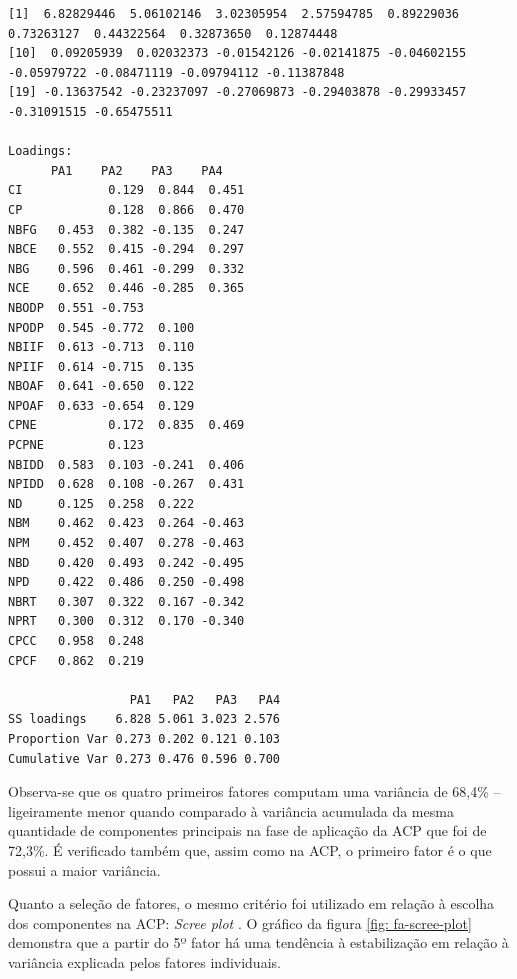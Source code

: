 \begin{lstlisting}[label={lst:loadings_fa_antes_rotacao}, captionpos=b, 
caption={Carregamentos da AF: o primeiro fator demonstra similaridade com o primeiro componente da ACP o que confirma a solidez e consistência das constatações até aqui verificadas.}]
 [1]  6.82829446  5.06102146  3.02305954  2.57594785  0.89229036  0.73263127  0.44322564  0.32873650  0.12874448
[10]  0.09205939  0.02032373 -0.01542126 -0.02141875 -0.04602155 -0.05979722 -0.08471119 -0.09794112 -0.11387848
[19] -0.13637542 -0.23237097 -0.27069873 -0.29403878 -0.29933457 -0.31091515 -0.65475511

Loadings:
      PA1    PA2    PA3    PA4   
CI            0.129  0.844  0.451
CP            0.128  0.866  0.470
NBFG   0.453  0.382 -0.135  0.247
NBCE   0.552  0.415 -0.294  0.297
NBG    0.596  0.461 -0.299  0.332
NCE    0.652  0.446 -0.285  0.365
NBODP  0.551 -0.753              
NPODP  0.545 -0.772  0.100       
NBIIF  0.613 -0.713  0.110       
NPIIF  0.614 -0.715  0.135       
NBOAF  0.641 -0.650  0.122       
NPOAF  0.633 -0.654  0.129       
CPNE          0.172  0.835  0.469
PCPNE         0.123              
NBIDD  0.583  0.103 -0.241  0.406
NPIDD  0.628  0.108 -0.267  0.431
ND     0.125  0.258  0.222       
NBM    0.462  0.423  0.264 -0.463
NPM    0.452  0.407  0.278 -0.463
NBD    0.420  0.493  0.242 -0.495
NPD    0.422  0.486  0.250 -0.498
NBRT   0.307  0.322  0.167 -0.342
NPRT   0.300  0.312  0.170 -0.340
CPCC   0.958  0.248              
CPCF   0.862  0.219              

                 PA1   PA2   PA3   PA4
SS loadings    6.828 5.061 3.023 2.576
Proportion Var 0.273 0.202 0.121 0.103
Cumulative Var 0.273 0.476 0.596 0.700
\end{lstlisting}

Observa-se que os quatro primeiros fatores computam uma variância de 68,4\% -- ligeiramente menor quando comparado à variância acumulada da mesma quantidade de componentes principais na fase de aplicação da ACP que foi de 72,3\%. É verificado também que, assim como na ACP, o primeiro fator é o que possui a maior variância.

Quanto a seleção de fatores, o mesmo critério foi utilizado em relação à escolha dos componentes na ACP: \textit{Scree plot} \cite[p.~109]{hair1998multivariate}. O gráfico da figura \ref{fig: fa-scree-plot} demonstra que a partir do 5º fator há uma tendência à estabilização em relação à variância explicada pelos fatores individuais.

